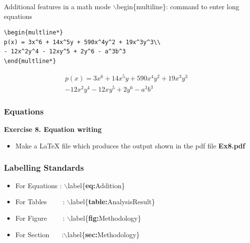 \documentclass [9pt] {beamer}
\begin{document}
\begin{frame}[containsverbatim]{Additional features in a math mode}
\textcolor[rgb]{0.98,0.00,0.00}{$\backslash$begin\{multiline\}}: command to enter long equations \\[0.4cm]
\begin{verbatim}
\begin{multline*}
p(x) = 3x^6 + 14x^5y + 590x^4y^2 + 19x^3y^3\\ 
- 12x^2y^4 - 12xy^5 + 2y^6 - a^3b^3
\end{multline*}
\end{verbatim} 
\begin{multline*}
p(x) = 3x^6 + 14x^5y + 590x^4y^2 + 19x^3y^3\\ 
- 12x^2y^4 - 12xy^5 + 2y^6 - a^3b^3
\end{multline*}
\end{frame}




\begin{frame}[fragile]\frametitle{Equations}
\rm
\textbf{Exercise 8. Equation writing}\\[.30cm]
\begin{itemize}
	\item Make a LaTeX file which produces the output shown in the pdf file \textbf{Ex8.pdf}
\end{itemize}
\end{frame}



\begin{frame}[fragile]\frametitle{Labelling Standards}
\rm
\fontsize{9pt}{11pt}\selectfont

\begin{itemize}
	\item	For Equations 	:  	$\backslash$label\{{\bf eq:}Addition\}\\[.20cm]
	\item	For Tables \ \ \	 \		:	$\backslash$label\{{\bf table:}AnalysisResult\}\\[.20cm]
	\item	For Figure	\ \ \ \		: 	$\backslash$label\{{\bf fig:}Methodology\}\\[.20cm]
	\item	For Section	 \ \ \		:$\backslash$label\{{\bf	sec:}Methodology\}\\[.20cm]
	
	
\end{itemize}

\end{frame}
\end{document}

